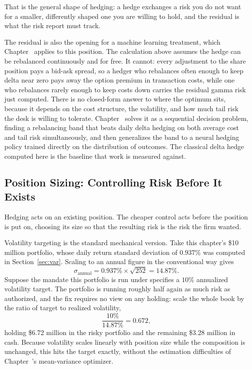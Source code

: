 \documentclass[../ai_in_finance]{subfiles}
\begin{document}
That is the general shape of hedging: a hedge exchanges a risk you do not want for a smaller, differently shaped one you are willing to hold, and the residual is what the risk report must track.

The residual is also the opening for a machine learning treatment, which Chapter~ applies to this position. The calculation above assumes the hedge can be rebalanced continuously and for free. It cannot: every adjustment to the share position pays a bid-ask spread, so a hedger who rebalances often enough to keep delta near zero pays away the option premium in transaction costs, while one who rebalances rarely enough to keep costs down carries the residual gamma risk just computed. There is no closed-form answer to where the optimum sits, because it depends on the cost structure, the volatility, and how much tail risk the desk is willing to tolerate. Chapter~ solves it as a sequential decision problem, finding a rebalancing band that beats daily delta hedging on both average cost and tail risk simultaneously, and then generalizes the band to a neural hedging policy trained directly on the distribution of outcomes. The classical delta hedge computed here is the baseline that work is measured against.

\subsection{Position Sizing: Controlling Risk Before It Exists}
\label{sec:position-sizing}

Hedging acts on an existing position. The cheaper control acts before the position is put on, choosing its size so that the resulting risk is the risk the firm wanted.

Volatility targeting is the standard mechanical version. Take this chapter's \$10 million portfolio, whose daily return standard deviation of $0.937\%$ was computed in Section~\ref{sec:var}. Scaling to an annual figure in the conventional way gives
\begin{equation*}
\sigma_{\text{annual}} = 0.937\% \times \sqrt{252} = 14.87\%.
\end{equation*}
Suppose the mandate this portfolio is run under specifies a $10\%$ annualized volatility target. The portfolio is running roughly half again as much risk as authorized, and the fix requires no view on any holding: scale the whole book by the ratio of target to realized volatility,
\begin{equation*}
\frac{10\%}{14.87\%} = 0.672,
\end{equation*}
holding \$6.72 million in the risky portfolio and the remaining \$3.28 million in cash. Because volatility scales linearly with position size while the composition is unchanged, this hits the target exactly, without the estimation difficulties of Chapter~'s mean-variance optimizer.
\end{document}
